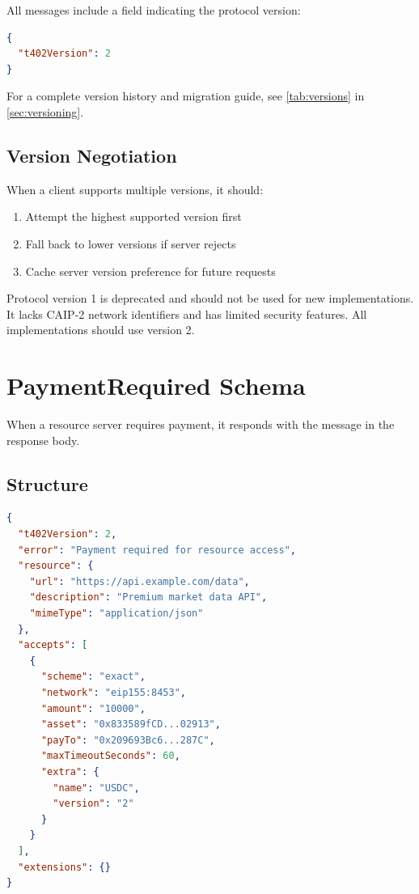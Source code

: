 All \tprotocol{} messages include a  field indicating the protocol version:

\begin{lstlisting}[language=json,caption={Version field}]
{
  "t402Version": 2
}
\end{lstlisting}

For a complete version history and migration guide, see \cref{tab:versions} in \cref{sec:versioning}.

\subsection{Version Negotiation}

When a client supports multiple versions, it should:

\begin{enumerate}
    \item Attempt the highest supported version first
    \item Fall back to lower versions if server rejects
    \item Cache server version preference for future requests
\end{enumerate}

\begin{warningbox}
Protocol version 1 is deprecated and should not be used for new implementations. It lacks CAIP-2 network identifiers and has limited security features. All implementations should use version 2.
\end{warningbox}

\section{PaymentRequired Schema}
\label{sec:payment-required}

When a resource server requires payment, it responds with the  message in the response body.

\subsection{Structure}

\begin{lstlisting}[language=json,caption={PaymentRequired schema}]
{
  "t402Version": 2,
  "error": "Payment required for resource access",
  "resource": {
    "url": "https://api.example.com/data",
    "description": "Premium market data API",
    "mimeType": "application/json"
  },
  "accepts": [
    {
      "scheme": "exact",
      "network": "eip155:8453",
      "amount": "10000",
      "asset": "0x833589fCD...02913",
      "payTo": "0x209693Bc6...287C",
      "maxTimeoutSeconds": 60,
      "extra": {
        "name": "USDC",
        "version": "2"
      }
    }
  ],
  "extensions": {}
}
\end{lstlisting}

